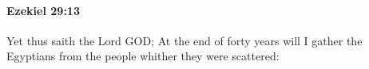 
		\paragraph{Ezekiel 29:13} %
			\label{EZEKIEL-29-13}

			Yet thus saith the Lord GOD; At the end of forty years will I gather the Egyptians from the people whither they were scattered:


